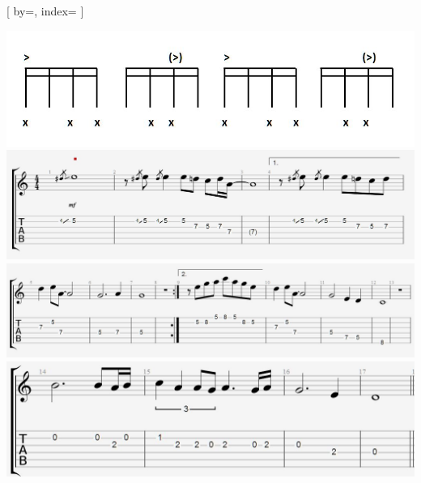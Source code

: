 [
	by={},
	index={}
]

\includegraphics[width=0.9\linewidth]{kuvat/han1}\\
\includegraphics[width=0.9\linewidth]{kuvat/han2}\\
\includegraphics[width=0.9\linewidth]{kuvat/han3}\\
\includegraphics[width=0.9\linewidth]{kuvat/han4}

\endsong